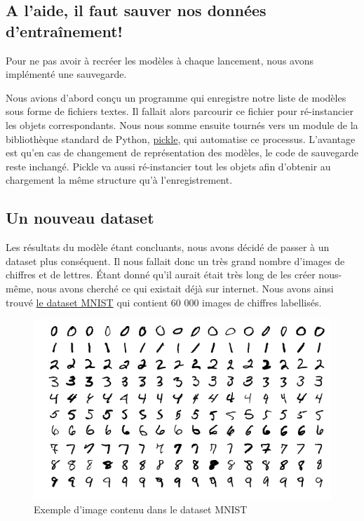 \documentclass[a4paper, 12pt]{article}
\begin{document}
\subsection{A l'aide, il faut sauver nos données d'entraînement!}
Pour ne pas avoir à recréer les modèles à chaque lancement, nous avons implémenté une sauvegarde.

Nous avions d'abord conçu un programme qui enregistre notre liste de modèles sous forme de fichiers textes. Il fallait alors parcourir ce fichier pour ré-instancier les objets correspondants. Nous nous somme ensuite tournés vers un module de la bibliothèque standard de Python, \href{https://docs.python.org/3.5/library/pickle.html}{pickle}, qui automatise ce processus. L'avantage est qu'en cas de changement de représentation des modèles, le code de sauvegarde reste inchangé. Pickle va aussi ré-instancier tout les objets afin d'obtenir au chargement la même structure qu'à l'enregistrement.

\subsection{Un nouveau dataset}

Les résultats du modèle étant concluants, nous avons décidé de passer à un dataset plus conséquent. Il nous fallait donc un très grand nombre d'images de chiffres et de lettres. Étant donné qu'il aurait était très long de les créer nous-même, nous avons cherché ce qui existait déjà sur internet. Nous avons ainsi trouvé  \href{http://yann.lecun.com/exdb/mnist/}{le dataset MNIST} qui contient 60 000 images de chiffres labellisés.

\begin{figure}[H]
  \centering
  \includegraphics[scale=0.55]{img/mnist.png}
  \caption{Exemple d'image contenu dans le dataset MNIST}
\end{figure}
\end{document}
